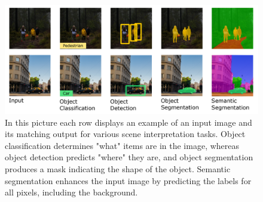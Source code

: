 \begin{figure}[H]
  \centering
  \includegraphics[width= 1.0\textwidth]{Figures/From input image to semantic segmentation.PNG}
  \caption[Illustration of From Input Image to Semantic Segmentation ]{In this picture each row displays an example of an input image and its matching output for various scene interpretation tasks. Object classification determines "what" items are in the image, whereas object detection predicts "where" they are, and object segmentation produces a mask indicating the shape of the object. Semantic segmentation enhances the input image by predicting the labels for all pixels, including the background.
 \cite{hurtado2022semantic}}
  \label{fig:From input image to semantic segmentation}
\end{figure}












